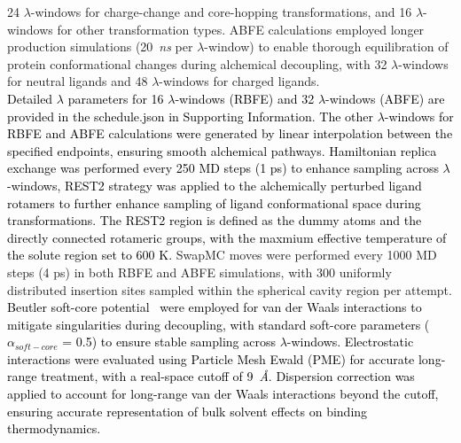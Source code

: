 \documentclass[journal=jacsat,manuscript=article]{achemso}
\newcommand*{\textblue}[1]{\textcolor{black}{#1}}
\begin{document}
24 $\lambda$-windows for charge-change and core-hopping transformations, and 16 $\lambda$-windows for other transformation types. 
ABFE calculations employed longer production simulations (20~\textit{ns} per $\lambda$-window) to enable thorough equilibration of protein conformational changes during alchemical decoupling, 
with 32 $\lambda$-windows for neutral ligands and 48 $\lambda$-windows for charged ligands. \\
\newline
\textblue{
  Detailed $\lambda$ parameters for 16 $\lambda$-windows (RBFE) and 32 $\lambda$-windows (ABFE) are provided in the schedule.json in Supporting Information.
  The other $\lambda$-windows for RBFE and ABFE calculations were generated by linear interpolation between the specified endpoints, ensuring smooth alchemical pathways.
  Hamiltonian replica exchange was performed every 250 MD steps (1 ps) to enhance sampling across $\lambda$-windows,
  REST2 strategy was applied to the alchemically perturbed ligand rotamers to further enhance sampling of ligand conformational space during transformations.
  The REST2 region is defined as the dummy atoms and the directly connected rotameric groups, 
  with the maxmium effective temperature of the solute region set to 600 K.
}
SwapMC moves were performed every 1000 MD steps (4 ps) in both RBFE and ABFE simulations, with 300 uniformly distributed insertion sites sampled within the spherical cavity region per attempt. \\
\newline
\textblue{
Beutler soft-core potential~\cite{Beutler_1994} were employed for van der Waals interactions to 
mitigate singularities during decoupling, with standard soft-core parameters ($\alpha_{soft-core}$ = 0.5) to ensure stable sampling across $\lambda$-windows.
Electrostatic interactions were evaluated using Particle Mesh Ewald (PME) for accurate long-range treatment, with a real-space cutoff of 9~\textit{\AA}.
Dispersion correction was applied to account for long-range van der Waals interactions beyond the cutoff, ensuring accurate representation of bulk solvent effects on binding thermodynamics.
}
\end{document}
